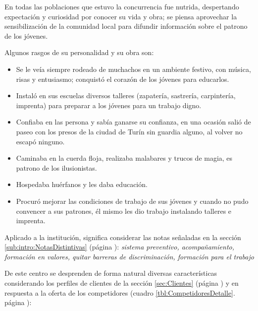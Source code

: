 En todas las poblaciones que estuvo la concurrencia fue nutrida, despertando expectación y curiosidad por conocer su vida y obra; se piensa aprovechar la sensibilización de la comunidad local para difundir información sobre el patrono de los jóvenes.

Algunos rasgos de su personalidad y su obra son:

\begin{itemize}
	\item Se le veía siempre rodeado de muchachos en un ambiente festivo, con música, risas y entusiasmo; conquistó el corazón de los jóvenes para educarlos.
	\item Instaló en sus escuelas diversos talleres (zapatería, sastrería, carpintería, imprenta) para preparar a los jóvenes para un trabajo digno.
	\item Confiaba en las persona y sabía ganarse su confianza, en una ocasión salió de paseo con los presos de la ciudad de Turín sin guardia alguno, al volver no escapó ninguno.
	\item Caminaba en la cuerda floja, realizaba malabares y trucos de magia, es patrono de los ilusionistas.
	\item Hospedaba huérfanos y les daba educación.
	\item Procuró mejorar las condiciones de trabajo de sus jóvenes y cuando no pudo convencer a sus patrones, él mismo les dio trabajo instalando talleres e imprenta.
\end{itemize}

Aplicado a la institución, significa considerar las notas señaladas en la sección \ref{sub:intro:NotasDistintivas} (página \pageref{sub:intro:NotasDistintivas}): \emph{sistema preventivo, acompañamiento, formación en valores, quitar barreras de discriminación, formación para el trabajo}

De este centro se desprenden de forma natural diversas características considerando los perfiles de clientes de la sección \ref{sec:Clientes} (página \pageref{sec:Clientes}) y en respuesta a la oferta de los competidores (cuadro \ref{tbl:CompetidoresDetalle}. p\'agina \pageref{tbl:CompetidoresDetalle}):


